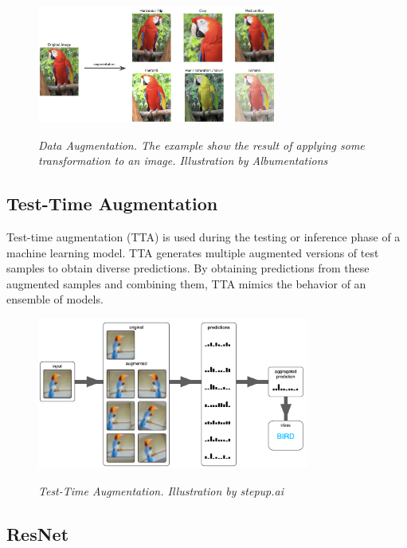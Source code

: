 \begin{figure}[H]
\centering
\includegraphics[width=0.7\textwidth]{imatges/preliminaries/augmentation.jpg}
\caption[Data Augmentation]{\textit{Data Augmentation. The example show the result of applying some transformation to an image. Illustration by Albumentations}}
{\label{fig:augmentation}}
\end{figure}


\subsection{Test-Time Augmentation}

Test-time augmentation (TTA) is used during the testing or inference phase of a machine learning model. TTA generates multiple augmented versions of test samples to obtain diverse predictions. By obtaining predictions from these augmented samples and combining them, TTA mimics the behavior of an ensemble of models.

\begin{figure}[H]
\centering
\includegraphics[width=0.8\textwidth]{imatges/preliminaries/tta.png}
\caption[Test-Time Augmentation]{\textit{Test-Time Augmentation. Illustration by stepup.ai}}
{\label{fig:tta}}
\end{figure}

\newpage

\subsection{ResNet}

